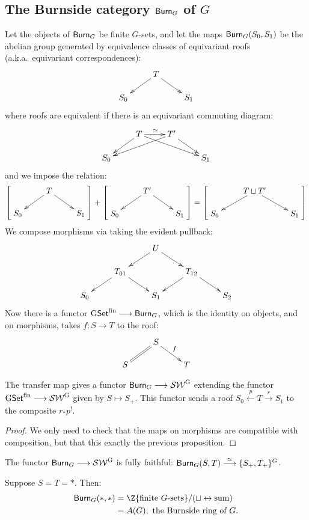 \documentclass[11pt]{article}
\begin{document}
\subsection*{The Burnside category $\operatorname{{\mathsf{Burn}}}_G$ of $G$}
Let the objects of $\operatorname{{\mathsf{Burn}}}_G$ be finite $G$-sets, and let the maps $\operatorname{{\mathsf{Burn}}}_G(S_0,S_1)$ be the abelian group generated by equivalence classes of equivariant roofs (a.k.a.\ equivariant correspondences):
\[\xymatrix@R=5mm{&T\ar[dl]\ar[dr]\\S_0&&S_1}\]
where roofs are equivalent if there is an equivariant commuting diagram:
\[\xymatrix@R=5mm{&T\ar[dl]\ar[drr]\ar[r]^\simeq&T'\ar[dll]\ar[dr]
\\S_0&&&S_1}\]
and we impose the relation:
\[
\left[\raisebox{.5cm}[.8cm][0cm] {$\xymatrix@R=5mm{&T\ar[dl]\ar[dr]\\S_0&&S_1}$}\right]
+
\left[\raisebox{.5cm}[.8cm][0cm] {$\xymatrix@R=5mm{&T'\ar[dl]\ar[dr]\\S_0&&S_1}$}\right]
=\left[\raisebox{.5cm}[.8cm][0cm] {$\xymatrix@R=5mm{&T\sqcup T'\ar[dl]\ar[dr]\\S_0&&S_1}$}\right]
\]
We compose morphisms via taking the evident pullback:
\[\xymatrix@R=5mm{
&&U\ar[dl]\ar[dr]\\
&T_{01}\ar[dl]\ar[dr]&&T_{12}\ar[dl]\ar[dr]\\
S_0&&S_1&&S_2
}\]
Now there is a functor $\operatorname{{G\mathsf{Set}^\textup{fin}}}\longrightarrow\operatorname{{\mathsf{Burn}}}_G$, which is the identity on objects, and on morphisms, takes $f:S\to T$ to the roof:
\[\xymatrix@R=5mm{&S\ar@{=}[dl]\ar[dr]^f\\S&&T}\]
\begin{prop*}
The transfer map gives a functor $\operatorname{{\mathsf{Burn}}}_G\longrightarrow\operatorname{{\mathcal{SW}^G}}$ extending the functor $\operatorname{{G\mathsf{Set}^\textup{fin}}}\longrightarrow\operatorname{{\mathcal{SW}^G}}$ given by $S\mapsto S_+$. This functor sends a roof $S_0\overset{p}{\longleftarrow} T\overset{r}{\longrightarrow}S_1$ to the composite $r_* p^!$.
\end{prop*}
\begin{proof}
We only need to check that the maps on morphisms are compatible with composition, but that this exactly the previous proposition.
\end{proof}
\begin{thm*}
The functor $\operatorname{{\mathsf{Burn}}}_G\longrightarrow \operatorname{{\mathcal{SW}^G}}$ is fully faithful: $\operatorname{{\mathsf{Burn}}}_G(S,T)\overset{\simeq}{\longrightarrow}\{S_+,T_+\}^G$.
\end{thm*}
\begin{exmp*}
Suppose $S=T=*$. Then:
\begin{align*}
\Burnside_G(*,*)&=\Z\{\text{finite $G$-sets}\}/({\displaystyle\sqcup\leftrightarrow\text{sum}})\\
&=A(G),\text{ the Burnside ring of $G$.}
\end{align*}
\end{exmp*}
\end{document}
